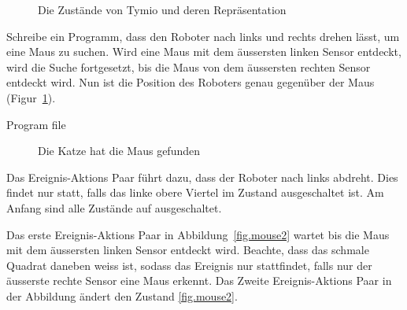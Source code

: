 


\begin{figure}
	\hfill
	\caption{Die Zustände von Tymio und deren Repräsentation}
\end{figure}



Schreibe ein Programm, dass den Roboter nach links und rechts drehen lässt, um eine Maus zu suchen. Wird eine Maus mit dem äussersten linken Sensor entdeckt, wird die Suche fortgesetzt, bis die Maus von dem äussersten rechten Sensor entdeckt wird. Nun ist die Position des Roboters genau gegenüber der Maus (Figur~\ref{fig.cat-mouse}).

{\raggedleft \hfill Program file }


\begin{figure}
\begin{center}
\caption{Die Katze hat die Maus gefunden}
\label{fig.cat-mouse}
\end{center}
\end{figure}

Das Ereignis-Aktions Paar
führt dazu, dass der Roboter nach links abdreht. Dies findet nur statt, falls das linke obere Viertel im Zustand ausgeschaltet ist. Am Anfang sind alle Zustände auf ausgeschaltet.


Das erste Ereignis-Aktions Paar in Abbildung~\ref{fig.mouse2} wartet bis die Maus mit dem äussersten linken Sensor entdeckt wird. Beachte, dass das schmale Quadrat daneben weiss ist, sodass das Ereignis nur stattfindet, falls nur der äusserste rechte Sensor eine Maus erkennt. Das Zweite Ereignis-Aktions Paar in der Abbildung ändert den Zustand \cref{fig.mouse2}.

